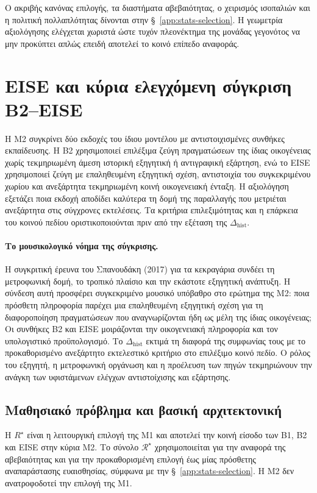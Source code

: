 \documentclass[11pt,a4paper]{article}
\begin{document}
Ο ακριβής κανόνας επιλογής, τα διαστήματα αβεβαιότητας, ο χειρισμός ισοπαλιών και η πολιτική πολλαπλότητας δίνονται στην §~\ref{app:stats-selection}. Η γεωμετρία αξιολόγησης ελέγχεται χωριστά ώστε τυχόν πλεονέκτημα της μονάδας γεγονότος να μην προκύπτει απλώς επειδή αποτελεί το κοινό επίπεδο αναφοράς.

\section{EISE και κύρια ελεγχόμενη σύγκριση B2--EISE}\label{sec:eise}

Η M2 συγκρίνει δύο εκδοχές του ίδιου μοντέλου με αντιστοιχισμένες συνθήκες εκπαίδευσης. Η B2 χρησιμοποιεί επιλέξιμα ζεύγη πραγματώσεων της ίδιας οικογένειας χωρίς τεκμηριωμένη άμεση ιστορική εξηγητική ή αντιγραφική εξάρτηση, ενώ το EISE χρησιμοποιεί ζεύγη με επαληθευμένη εξηγητική σχέση, αντιστοιχία του συγκεκριμένου χωρίου και ανεξάρτητα τεκμηριωμένη κοινή οικογενειακή ένταξη. Η αξιολόγηση εξετάζει ποια εκδοχή αποδίδει καλύτερα τη δομή της παραλλαγής που μετριέται ανεξάρτητα στις σύγχρονες εκτελέσεις. Τα κριτήρια επιλεξιμότητας και η επάρκεια του κοινού πεδίου οριστικοποιούνται πριν από την εξέταση της $\Delta_{\mathrm{hist}}$.

\paragraph{Το μουσικολογικό νόημα της σύγκρισης.} Η συγκριτική έρευνα του Σπανουδάκη (2017) για τα κεκραγάρια συνδέει τη μετροφωνική δομή, το τροπικό πλαίσιο και την εκάστοτε εξηγητική ανάπτυξη. Η σύνδεση αυτή προσφέρει συγκεκριμένο μουσικό υπόβαθρο στο ερώτημα της M2: ποια πρόσθετη πληροφορία παρέχει μια επαληθευμένη εξηγητική σχέση για τη διαφοροποίηση πραγματώσεων που αναγνωρίζονται ήδη ως μέλη της ίδιας οικογένειας; Οι συνθήκες B2 και EISE μοιράζονται την οικογενειακή πληροφορία και τον υπολογιστικό προϋπολογισμό. Το $\Delta_{\mathrm{hist}}$ εκτιμά τη διαφορά της συμφωνίας τους με το προκαθορισμένο ανεξάρτητο εκτελεστικό κριτήριο στο επιλέξιμο κοινό πεδίο. Ο ρόλος του εξηγητή, η μετροφωνική οργάνωση και η προέλευση των πηγών τεκμηριώνουν την ανάγκη των υφιστάμενων ελέγχων αντιστοίχισης και εξάρτησης.

\subsection{Μαθησιακό πρόβλημα και βασική αρχιτεκτονική}

Η $R^\star$ είναι η λειτουργική επιλογή της M1 και αποτελεί την κοινή είσοδο των B1, B2 και EISE στην κύρια M2. Το σύνολο $\mathcal R^\star$ χρησιμοποιείται για την αναφορά της αβεβαιότητας και για την προκαθορισμένη επιλογή έως μίας πρόσθετης αναπαράστασης ευαισθησίας, σύμφωνα με την §~\ref{app:stats-selection}. Η M2 δεν ανατροφοδοτεί την επιλογή της M1.
\end{document}
